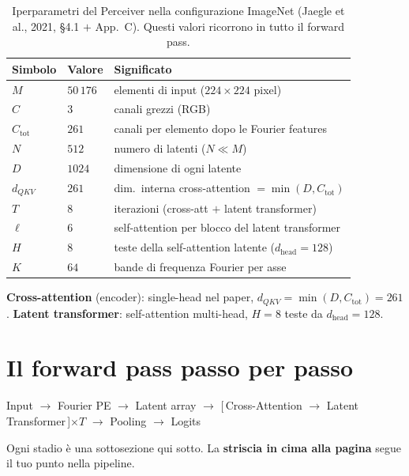 \documentclass[11pt]{article}
\newcommand{\curstage}{0}
\newcommand{\stage}[1]{\gdef\curstage{#1}}
\begin{document}
\begin{table}[htbp]
\centering
\caption{Iperparametri del Perceiver nella configurazione ImageNet (Jaegle et al., 2021, \S4.1 $+$ App.~C). Questi valori ricorrono in tutto il forward pass.}
\begin{tabular}{@{}lll@{}}
\toprule
\textbf{Simbolo} & \textbf{Valore} & \textbf{Significato} \\
\midrule
$M$               & $50\,176$  & elementi di input ($224\times224$ pixel) \\
$C$               & $3$        & canali grezzi (RGB) \\
$C_{\text{tot}}$  & $261$      & canali per elemento dopo le Fourier features \\
$N$               & $512$      & numero di latenti \quad ($N \ll M$) \\
$D$               & $1024$     & dimensione di ogni latente \\
$d_{QKV}$         & $261$      & dim.\ interna cross-attention $= \min(D, C_{\text{tot}})$ \\
$T$               & $8$        & iterazioni (cross-att $+$ latent transformer) \\
$\ell$            & $6$        & self-attention per blocco del latent transformer \\
$H$               & $8$        & teste della self-attention latente ($d_{\text{head}}=128$) \\
$K$               & $64$       & bande di frequenza Fourier per asse \\
\bottomrule
\end{tabular}
\end{table}

\begin{notabox}
\textbf{Cross-attention} (encoder): single-head nel paper, $d_{QKV} = \min(D, C_{\text{tot}}) = 261$. \quad
\textbf{Latent transformer}: self-attention multi-head, $H=8$ teste da $d_{\text{head}} = 128$.
\end{notabox}

\section{Il forward pass passo per passo}
\stage{0}

\begin{brevebox}[title={\textbf{In breve --- la pipeline}}]
\centering
Input $\to$ Fourier PE $\to$ Latent array $\to$ [\,Cross-Attention $\to$ Latent Transformer\,]$\times T$ $\to$ Pooling $\to$ Logits

\smallskip
\raggedright\small Ogni stadio è una sottosezione qui sotto. La \textbf{striscia in cima alla pagina} segue il tuo punto nella pipeline.
\end{brevebox}
\end{document}
